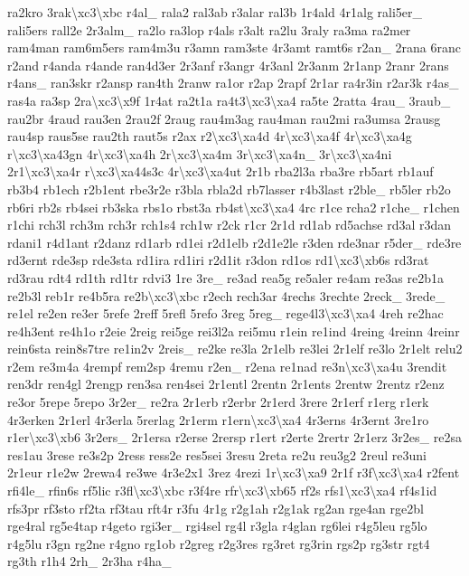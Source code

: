 {ra2kro 3rak\textbackslash{}xc3\textbackslash{}xbc r4al\-\_\- rala2 ral3ab r3alar ral3b 1r4ald 4r1alg rali5er\-\_\- rali5ers rall2e 2r3alm\-\_\- ra2lo ra3lop r4als r3alt ra2lu 3raly ra3ma ra2mer ram4man ram6m5ers ram4m3u r3amn ram3ste 4r3amt ramt6s r2an\-\_\- 2rana 6ranc r2and r4anda r4ande ran4d3er 2r3anf r3angr 4r3anl 2r3anm 2r1anp 2ranr 2rans r4ans\-\_\- ran3skr r2ansp ran4th 2ranw ra1or r2ap 2rapf 2r1ar ra4r3in r2ar3k r4as\-\_\- ras4a ra3sp 2ra\textbackslash{}xc3\textbackslash{}x9f 1r4at ra2t1a ra4t3\textbackslash{}xc3\textbackslash{}xa4 ra5te 2ratta 4rau\-\_\- 3raub\-\_\- rau2br 4raud rau3en 2rau2f 2raug rau4m3ag rau4man rau2mi ra3umsa 2rausg rau4sp raus5se rau2th raut5s r2ax r2\textbackslash{}xc3\textbackslash{}xa4d 4r\textbackslash{}xc3\textbackslash{}xa4f 4r\textbackslash{}xc3\textbackslash{}xa4g r\textbackslash{}xc3\textbackslash{}xa43gn 4r\textbackslash{}xc3\textbackslash{}xa4h 2r\textbackslash{}xc3\textbackslash{}xa4m 3r\textbackslash{}xc3\textbackslash{}xa4n\-\_\- 3r\textbackslash{}xc3\textbackslash{}xa4ni 2r1\textbackslash{}xc3\textbackslash{}xa4r r\textbackslash{}xc3\textbackslash{}xa44s3c 4r\textbackslash{}xc3\textbackslash{}xa4ut 2r1b rba2l3a rba3re rb5art rb1auf rb3b4 rb1ech r2b1ent rbe3r2e r3bla rbla2d rb7lasser r4b3last r2ble\-\_\- rb5ler rb2o rb6ri rb2s rb4sei rb3ska rbs1o rbst3a rb4st\textbackslash{}xc3\textbackslash{}xa4 4rc r1ce rcha2 r1che\-\_\- r1chen r1chi rch3l rch3m rch3r rch1s4 rch1w r2ck r1cr 2r1d rd1ab rd5achse rd3al r3dan rdani1 r4d1ant r2danz rd1arb rd1ei r2d1elb r2d1e2le r3den rde3nar r5der\-\_\- rde3re rd3ernt rde3sp rde3sta rd1ira rd1iri r2d1it r3don rd1os rd1\textbackslash{}xc3\textbackslash{}xb6s rd3rat rd3rau rdt4 rd1th rd1tr rdvi3 1re 3re\-\_\- re3ad rea5g re5aler re4am re3as re2b1a re2b3l reb1r re4b5ra re2b\textbackslash{}xc3\textbackslash{}xbc r2ech rech3ar 4rechs 3rechte 2reck\-\_\- 3rede\-\_\- re1el re2en re3er 5refe 2reff 5refl 5refo 3reg 5reg\-\_\- rege4l3\textbackslash{}xc3\textbackslash{}xa4 4reh re2hac re4h3ent re4h1o r2eie 2reig rei5ge rei3l2a rei5mu r1ein re1ind 4reing 4reinn 4reinr rein6sta rein8s7tre re1in2v 2reis\-\_\- re2ke re3la 2r1elb re3lei 2r1elf re3lo 2r1elt relu2 r2em re3m4a 4rempf rem2sp 4remu r2en\-\_\- r2ena re1nad re3n\textbackslash{}xc3\textbackslash{}xa4u 3rendit ren3dr ren4gl 2rengp ren3sa ren4sei 2r1entl 2rentn 2r1ents 2rentw 2rentz r2enz re3or 5repe 5repo 3r2er\-\_\- re2ra 2r1erb r2erbr 2r1erd 3rere 2r1erf r1erg r1erk 4r3erken 2r1erl 4r3erla 5rerlag 2r1erm r1ern\textbackslash{}xc3\textbackslash{}xa4 4r3erns 4r3ernt 3re1ro r1er\textbackslash{}xc3\textbackslash{}xb6 3r2ers\-\_\- 2r1ersa r2erse 2rersp r1ert r2erte 2rertr 2r1erz 3r2es\-\_\- re2sa res1au 3rese re3s2p 2ress ress2e res5sei 3resu 2reta re2u reu3g2 2reul re3uni 2r1eur r1e2w 2rewa4 re3we 4r3e2x1 3rez 4rezi 1r\textbackslash{}xc3\textbackslash{}xa9 2r1f r3f\textbackslash{}xc3\textbackslash{}xa4 r2fent rfi4le\-\_\- rfin6s rf5lic r3fl\textbackslash{}xc3\textbackslash{}xbc r3f4re rfr\textbackslash{}xc3\textbackslash{}xb65 rf2s rfs1\textbackslash{}xc3\textbackslash{}xa4 rf4s1id rfs3pr rf3sto rf2ta rf3tau rft4r r3fu 4r1g r2g1ah r2g1ak rg2an rge4an rge2bl rge4ral rg5e4tap r4geto rgi3er\-\_\- rgi4sel rg4l r3gla r4glan rg6lei r4g5leu rg5lo r4g5lu r3gn rg2ne r4gno rg1ob r2greg r2g3res rg3ret rg3rin rgs2p rg3str rgt4 rg3th r1h4 2rh\-\_\- 2r3ha r4ha\-\_\- }

